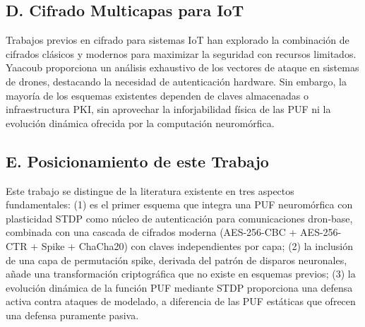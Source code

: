 \subsection*{D. Cifrado Multicapas para IoT}

Trabajos previos en cifrado para sistemas IoT han explorado la combinación de cifrados clásicos y modernos para maximizar la seguridad con recursos limitados. Yaacoub \cite{yaacoub2020drone} proporciona un análisis exhaustivo de los vectores de ataque en sistemas de drones, destacando la necesidad de autenticación hardware. Sin embargo, la mayoría de los esquemas existentes dependen de claves almacenadas o infraestructura PKI, sin aprovechar la inforjabilidad física de las PUF ni la evolución dinámica ofrecida por la computación neuromórfica.

\subsection*{E. Posicionamiento de este Trabajo}

Este trabajo se distingue de la literatura existente en tres aspectos fundamentales: (1) es el primer esquema que integra una PUF neuromórfica con plasticidad STDP como núcleo de autenticación para comunicaciones dron-base, combinada con una cascada de cifrados moderna (AES-256-CBC + AES-256-CTR + Spike + ChaCha20) con claves independientes por capa; (2) la inclusión de una capa de permutación spike, derivada del patrón de disparos neuronales, añade una transformación criptográfica que no existe en esquemas previos; (3) la evolución dinámica de la función PUF mediante STDP proporciona una defensa activa contra ataques de modelado, a diferencia de las PUF estáticas que ofrecen una defensa puramente pasiva.
